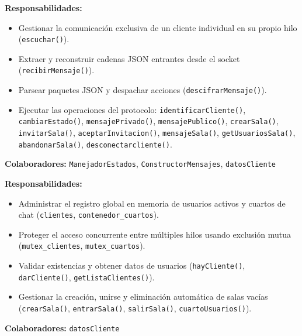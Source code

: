 \documentclass[11pt,a4paper]{article}
\begin{document}
\begin{tcolorbox}[colback=white,colframe=black,title=\textbf{Tarjeta CRC: ManejadorCliente}, fonttitle=\bfseries]
\textbf{Responsabilidades:}
\begin{itemize}
    \item Gestionar la comunicación exclusiva de un cliente individual en su propio hilo (\texttt{escuchar()}).
    \item Extraer y reconstruir cadenas JSON entrantes desde el socket (\texttt{recibirMensaje()}).
    \item Parsear paquetes JSON y despachar acciones (\texttt{descifrarMensaje()}).
    \item Ejecutar las operaciones del protocolo: \texttt{identificarCliente()}, \texttt{cambiarEstado()}, \texttt{mensajePrivado()}, \texttt{mensajePublico()}, \texttt{crearSala()}, \texttt{invitarSala()}, \texttt{aceptarInvitacion()}, \texttt{mensajeSala()}, \texttt{getUsuariosSala()}, \texttt{abandonarSala()}, \texttt{desconectarcliente()}.
\end{itemize}
\tcblower
\textbf{Colaboradores:} \texttt{ManejadorEstados}, \texttt{ConstructorMensajes}, \texttt{datosCliente}
\end{tcolorbox}

\begin{tcolorbox}[colback=white,colframe=black,title=\textbf{Tarjeta CRC: ManejadorEstados}, fonttitle=\bfseries]
\textbf{Responsabilidades:}
\begin{itemize}
    \item Administrar el registro global en memoria de usuarios activos y cuartos de chat (\texttt{clientes}, \texttt{contenedor\_cuartos}).
    \item Proteger el acceso concurrente entre múltiples hilos usando exclusión mutua (\texttt{mutex\_clientes}, \texttt{mutex\_cuartos}).
    \item Validar existencias y obtener datos de usuarios (\texttt{hayCliente()}, \texttt{darCliente()}, \texttt{getListaClientes()}).
    \item Gestionar la creación, unirse y eliminación automática de salas vacías (\texttt{crearSala()}, \texttt{entrarSala()}, \texttt{salirSala()}, \texttt{cuartoUsuarios()}).
\end{itemize}
\tcblower
\textbf{Colaboradores:} \texttt{datosCliente}
\end{tcolorbox}
\end{document}
